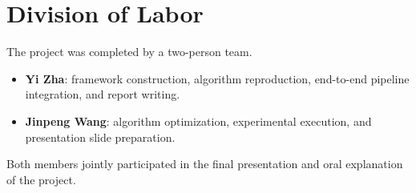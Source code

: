 \section{Division of Labor}

The project was completed by a two-person team.

\begin{itemize}[nosep]
  \item \textbf{Yi Zha}: framework construction, algorithm reproduction, end-to-end pipeline integration, and report writing.
  \item \textbf{Jinpeng Wang}: algorithm optimization, experimental execution, and presentation slide preparation.
\end{itemize}

Both members jointly participated in the final presentation and oral explanation of the project.
